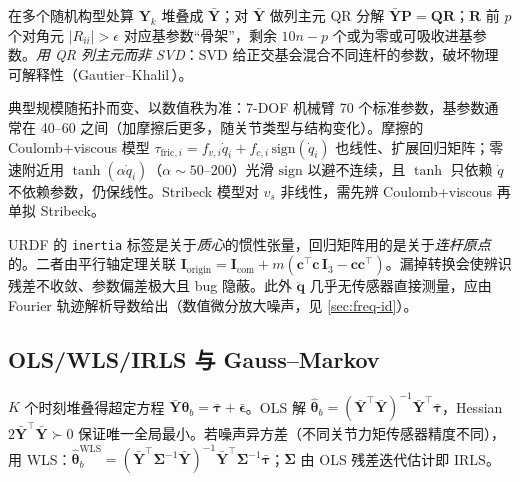 \begin{algo}
\label{alg:base-param}
在多个随机构型处算 $\mathbf Y_k$ 堆叠成 $\bar{\mathbf Y}$；对 $\bar{\mathbf Y}$ 做列主元 QR 分解 $\bar{\mathbf Y}\mathbf P=\mathbf Q\mathbf R$；$\mathbf R$ 前 $p$ 个对角元 $|R_{ii}|>\epsilon$ 对应基参数“骨架”，剩余 $10n-p$ 个或为零或可吸收进基参数。\emph{用 QR 列主元而非 SVD}：SVD 给正交基会混合不同连杆的参数，破坏物理可解释性（Gautier--Khalil\,\cite{gautier1991identifiable}）。
\end{algo}

典型规模随拓扑而变、以数值秩为准：7-DOF 机械臂 70 个标准参数，基参数通常在 40--60 之间（加摩擦后更多，随关节类型与结构变化）。摩擦的 Coulomb+viscous 模型 $\tau_{\text{fric},i}=f_{v,i}\dot q_i+f_{c,i}\,\mathrm{sign}(\dot q_i)$ 也线性、扩展回归矩阵；零速附近用 $\tanh(\alpha\dot q_i)$（$\alpha\sim50$--$200$）光滑 $\mathrm{sign}$ 以避不连续，且 $\tanh$ 只依赖 $\dot q$ 不依赖参数，仍保线性。Stribeck 模型对 $v_s$ 非线性，需先辨 Coulomb+viscous 再单拟 Stribeck。

\begin{pitfall}
URDF 的 \texttt{inertia} 标签是关于\emph{质心}的惯性张量，回归矩阵用的是关于\emph{连杆原点}的。二者由平行轴定理关联 $\mathbf I_{\text{origin}}=\mathbf I_{\text{com}}+m(\mathbf c^\top\mathbf c\,\mathbf I_3-\mathbf c\mathbf c^\top)$。漏掉转换会使辨识残差不收敛、参数偏差极大且 bug 隐蔽。此外 $\ddot{\mathbf q}$ 几乎无传感器直接测量，应由 Fourier 轨迹解析导数给出（数值微分放大噪声，见 \cref{sec:freq-id}）。
\end{pitfall}

\subsection{OLS/WLS/IRLS 与 Gauss--Markov}
$K$ 个时刻堆叠得超定方程 $\bar{\mathbf Y}\boldsymbol\theta_b=\bar{\boldsymbol\tau}+\bar{\boldsymbol\epsilon}$。OLS 解 $\hat{\boldsymbol\theta}_b=(\bar{\mathbf Y}^\top\bar{\mathbf Y})^{-1}\bar{\mathbf Y}^\top\bar{\boldsymbol\tau}$，Hessian $2\bar{\mathbf Y}^\top\bar{\mathbf Y}\succ0$ 保证唯一全局最小。若噪声异方差（不同关节力矩传感器精度不同），用 WLS：$\hat{\boldsymbol\theta}_b^{\text{WLS}}=(\bar{\mathbf Y}^\top\boldsymbol\Sigma^{-1}\bar{\mathbf Y})^{-1}\bar{\mathbf Y}^\top\boldsymbol\Sigma^{-1}\bar{\boldsymbol\tau}$；$\boldsymbol\Sigma$ 由 OLS 残差迭代估计即 IRLS。

